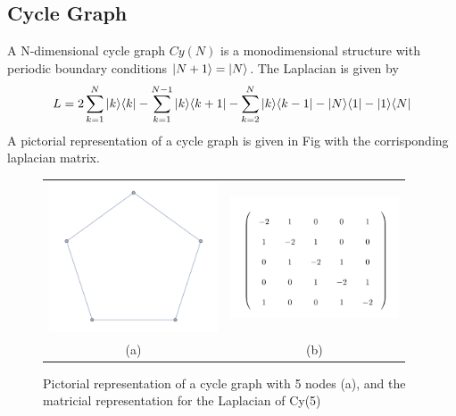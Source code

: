     \subsection{Cycle Graph}
        A N-dimensional cycle graph $Cy(N)$ is a monodimensional structure with periodic boundary conditions ${|{N+1}\rangle}={|{N}\rangle}$. The Laplacian is given by
        \begin{equation}
            L = 2\sum_{k=1}^{N}{|{k}\rangle}{\langle{k}|} - \sum_{k=1}^{N-1}{|{k}\rangle}{\langle{k+1}|} - \sum_{k=2}^{N}{|{k}\rangle}{\langle{k-1}|}- {|{N}\rangle}{\langle{1}|}-{|{1}\rangle}{\langle{N}|}
        \end{equation}
        A pictorial representation of a cycle graph is given in Fig with the corrisponding laplacian matrix.
        \begin{figure}[ht]
          \centering
          \begin{tabular}{cc}
            \includegraphics[width=50mm]{./figures/chapter1/cycle} &   \includegraphics[width=50mm]{./figures/chapter1/cycleL} \\
          (a)  & (b) \\[6pt]
          \end{tabular}
          \caption[Pictorial representation of a cycle graph, and matricial representation for the Laplacian]{Pictorial representation of a cycle graph with 5 nodes (a), and the matricial representation for the Laplacian of Cy(5)}
        \end{figure}
    \vspace{-0.7cm}
